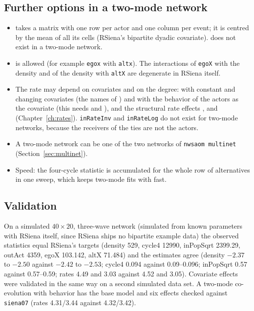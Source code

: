 \subsection{Further options in a two-mode network}
\begin{itemize}
\item {} takes a matrix with one row per actor and one column per event; it is centred by the mean of all its cells (RSiena's bipartite dyadic covariate).  does not exist in a two-mode network.
\item {} is allowed (for example \texttt{egox} with \texttt{altx}). The interactions of \texttt{egoX} with the density and of the density with \texttt{altX} are degenerate in RSiena itself.
\item The rate may depend on covariates and on the degree:  with constant and changing covariates (the names of ) and with the behavior of the actors as the covariate (this needs  and ), and the structural rate effects ,  and  (Chapter~\ref{ch:rates}). \texttt{inRateInv} and \texttt{inRateLog} do not exist for two-mode networks, because the receivers of the ties are not the actors.
\item A two-mode network can be one of the two networks of \texttt{nwsaom multinet} (Section~\ref{sec:multinet}).
\item Speed: the four-cycle statistic is accumulated for the whole row of alternatives in one sweep, which keeps two-mode fits with  fast.
\end{itemize}

\subsection{Validation}

On a simulated $40\times20$, three-wave network (simulated from known parameters with RSiena itself, since RSiena ships no bipartite example data) the observed statistics equal RSiena's targets (density 529, cycle4 12990, inPopSqrt 2399.29, outAct 4359, egoX 103.142, altX 71.484) and the estimates agree (density $-2.37$ to $-2.50$ against $-2.42$ to $-2.53$; cycle4 0.094 against 0.09--0.096; inPopSqrt 0.57 against 0.57--0.59; rates 4.49 and 3.03 against 4.52 and 3.05). Covariate effects were validated in the same way on a second simulated data set. A two-mode co-evolution with behavior has the base model and six effects checked against \texttt{siena07} (rates 4.31/3.44 against 4.32/3.42).

